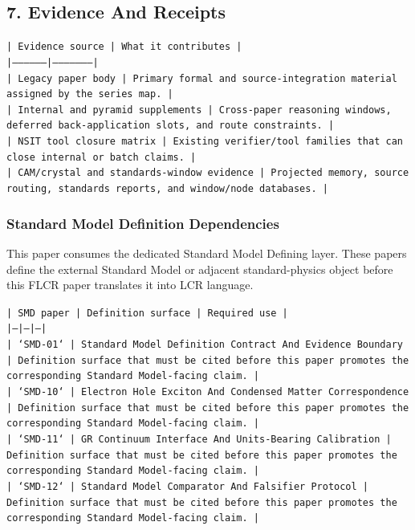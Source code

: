 \documentclass[11pt]{article}
\begin{document}
\subsection*{7. Evidence And Receipts}

\noindent\texttt{| Evidence source | What it contributes |}\\
\noindent\texttt{|-----------------|---------------------|}\\
\noindent\texttt{| Legacy paper body | Primary formal and source-integration material assigned by the series map. |}\\
\noindent\texttt{| Internal and pyramid supplements | Cross-paper reasoning windows, deferred back-application slots, and route constraints. |}\\
\noindent\texttt{| NSIT tool closure matrix | Existing verifier/tool families that can close internal or batch claims. |}\\
\noindent\texttt{| CAM/crystal and standards-window evidence | Projected memory, source routing, standards reports, and window/node databases. |}\\

\subsubsection*{Standard Model Definition Dependencies}

This paper consumes the dedicated Standard Model Defining layer. These papers define the external Standard Model or adjacent standard-physics object before this FLCR paper translates it into LCR language.

\noindent\texttt{| SMD paper | Definition surface | Required use |}\\
\noindent\texttt{|---|---|---|}\\
\noindent\texttt{| `SMD-01` | Standard Model Definition Contract And Evidence Boundary | Definition surface that must be cited before this paper promotes the corresponding Standard Model-facing claim. |}\\
\noindent\texttt{| `SMD-10` | Electron Hole Exciton And Condensed Matter Correspondence | Definition surface that must be cited before this paper promotes the corresponding Standard Model-facing claim. |}\\
\noindent\texttt{| `SMD-11` | GR Continuum Interface And Units-Bearing Calibration | Definition surface that must be cited before this paper promotes the corresponding Standard Model-facing claim. |}\\
\noindent\texttt{| `SMD-12` | Standard Model Comparator And Falsifier Protocol | Definition surface that must be cited before this paper promotes the corresponding Standard Model-facing claim. |}\\
\end{document}
